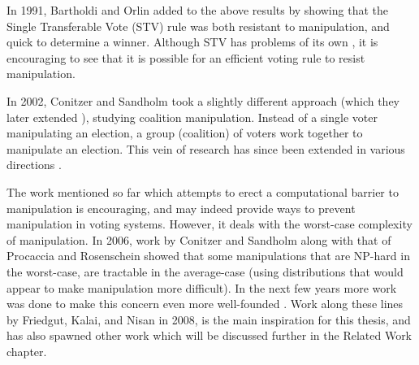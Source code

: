 	In 1991, Bartholdi and Orlin \cite{bartholdi1991single} added to the above results by showing that the Single Transferable Vote (STV) rule was both resistant to manipulation, and quick to determine a winner. Although STV has problems of its own \cite{brams1982ams, doron1977single, fishburn1983paradoxes, holzman1989vote, moulin1988condorcet}, it is encouraging to see that it is possible for an efficient voting rule to resist manipulation.

	In 2002, Conitzer and Sandholm took a slightly different approach \cite{conitzer2002vote} (which they later extended \cite{conitzer2007elections}), studying coalition manipulation. Instead of a single voter manipulating an election, a group (coalition) of voters work together to manipulate an election. This vein of research has since been extended in various directions \cite{conitzer2003universal, elkind2005hybrid, faliszewski2006complexity, hemaspaandra2007anyone, procaccia2007multi, elkind2005small}.

	The work mentioned so far which attempts to erect a computational barrier to manipulation is encouraging, and may indeed provide ways to prevent manipulation in voting systems. However, it deals with the worst-case complexity of manipulation. In 2006, work by Conitzer and Sandholm \cite{conitzer2006nonexistence} along with that of Procaccia and Rosenschein \cite{procaccia2006junta} showed that some manipulations that are NP-hard in the worst-case, are tractable in the average-case (using distributions that would appear to make manipulation more difficult). In the next few years more work was done to make this concern even more well-founded \cite{procaccia2007average, erdelyi2007approximating}. Work along these lines by Friedgut, Kalai, and Nisan \cite{friedgut2008elections} in 2008, is the main inspiration for this thesis, and has also spawned other work which will be discussed further in the Related Work chapter.
